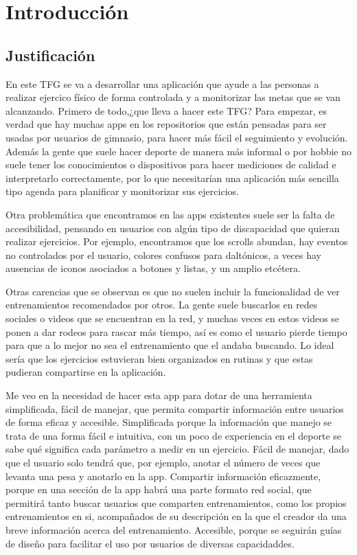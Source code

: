 \chapter{Introducción}

\section{Justificación}

En este TFG se va a desarrollar una aplicación que ayude a las personas a realizar ejercico físico de forma controlada y a monitorizar las metas que se van alcanzando.
Primero de todo,¿que lleva a hacer este TFG? Para empezar, es verdad que hay muchas apps en los repositorios que están pensadas para ser usadas por usuarios de gimnasio, para hacer más fácil el seguimiento y evolución.
Además la gente que suele hacer deporte de manera más informal o por hobbie no suele tener los conocimientos o dispositivos para hacer mediciones de calidad e interpretarlo correctamente, por lo que necesitarían una aplicación más sencilla tipo agenda para planificar y monitorizar sus ejercicios. 

Otra problemática que encontramos en las apps existentes suele ser la falta de accesibilidad, pensando en usuarios con algún tipo de discapacidad que quieran realizar ejercicios. Por ejemplo, encontramos que los scrolls abundan, hay eventos no controlados por el usuario, colores confusos para daltónicos, a veces hay ausencias de iconos asociados a botones y listas, y un amplio etcétera. 

Otras carencias que se observan es que no suelen incluir la funcionalidad de ver entrenamientos recomendados por otros. La gente suele buscarlos en redes sociales o videos que se encuentran en la red, y muchas veces en estos videos se ponen a dar rodeos para rascar más tiempo, así es como el usuario pierde tiempo para que a lo mejor no sea el entrenamiento que el andaba buscando. Lo ideal sería que los ejercicios estuvieran bien organizados en rutinas y que estas pudieran compartirse en la aplicación.

Me veo en la necesidad de hacer esta app para dotar de una herramienta simplificada, fácil de manejar, que permita compartir información entre usuarios de forma eficaz y accesible. Simplificada porque la información que manejo se trata de una forma fácil e intuitiva, con un poco de experiencia en el deporte se sabe qué significa cada parámetro a medir en un ejercicio.
Fácil de manejar, dado que el usuario solo tendrá que, por ejemplo, anotar el número de veces que levanta una pesa y anotarlo en la app. Compartir información eficazmente, porque en una sección de la app habrá una parte formato red social, que permitirá tanto buscar usuarios que comparten entrenamientos, como los propios entrenamientos en si, acompañados de su descripción en la que el creador da una breve información acerca del entrenamiento. Accesible, porque se seguirán guías de diseño para facilitar el uso por usuarios de diversas capacidaddes.

